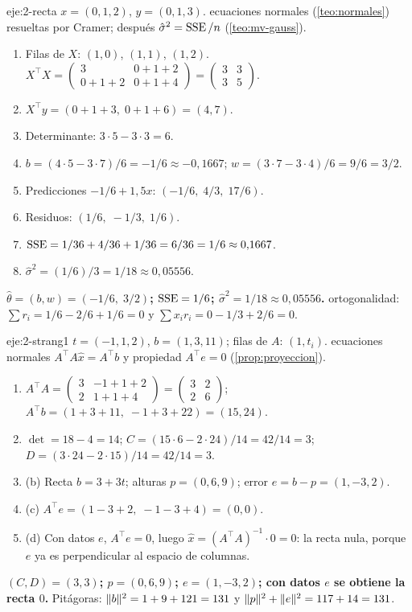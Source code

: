 \begin{solucion}{eje:2-recta}
\datos $x=(0,1,2)$, $y=(0,1,3)$.
\planteamiento ecuaciones normales (\cref{teo:normales}) resueltas por Cramer; después $\hat\sigma^{2}=\operatorname{SSE}/n$ (\cref{teo:mv-gauss}).
\pasos
\begin{enumerate}[label=\arabic*.]
  \item Filas de $X$: $(1,0)$, $(1,1)$, $(1,2)$. $X^{\top}X=\begin{pmatrix}3&0+1+2\\0+1+2&0+1+4\end{pmatrix}=\begin{pmatrix}3&3\\3&5\end{pmatrix}$.
  \item $X^{\top}y=(0+1+3,\;0+1+6)=(4,7)$.
  \item Determinante: $3\cdot 5-3\cdot 3=6$.
  \item $b=(4\cdot 5-3\cdot 7)/6=-1/6\approx-0{,}1667$; $w=(3\cdot 7-3\cdot 4)/6=9/6=3/2$.
  \item Predicciones $-1/6+1{,}5x$: $(-1/6,\;4/3,\;17/6)$.
  \item Residuos: $(1/6,\;-1/3,\;1/6)$.
  \item $\operatorname{SSE}=1/36+4/36+1/36=6/36=1/6\approx 0{,}1667$.
  \item $\hat\sigma^{2}=(1/6)/3=1/18\approx 0{,}05556$.
\end{enumerate}
\resultado \textbf{$\hat\theta=(b,w)=(-1/6,\;3/2)$; $\operatorname{SSE}=1/6$; $\hat\sigma^{2}=1/18\approx 0{,}05556$.}
\comprobacion ortogonalidad: $\sum r_i=1/6-2/6+1/6=0$ y $\sum x_ir_i=0-1/3+2/6=0$.
\end{solucion}

\begin{solucion}{eje:2-strang1}
\datos $t=(-1,1,2)$, $b=(1,3,11)$; filas de $A$: $(1,t_i)$.
\planteamiento ecuaciones normales $A^{\top}A\hat x=A^{\top}b$ y propiedad $A^{\top}e=0$ (\cref{prop:proyeccion}).
\pasos
\begin{enumerate}[label=\arabic*.]
  \item $A^{\top}A=\begin{pmatrix}3&-1+1+2\\2&1+1+4\end{pmatrix}=\begin{pmatrix}3&2\\2&6\end{pmatrix}$; $A^{\top}b=(1+3+11,\;-1+3+22)=(15,24)$.
  \item $\det=18-4=14$; $C=(15\cdot 6-2\cdot 24)/14=42/14=3$; $D=(3\cdot 24-2\cdot 15)/14=42/14=3$.
  \item (b) Recta $b=3+3t$; alturas $p=(0,6,9)$; error $e=b-p=(1,-3,2)$.
  \item (c) $A^{\top}e=(1-3+2,\;-1-3+4)=(0,0)$.
  \item (d) Con datos $e$, $A^{\top}e=0$, luego $\hat x=(A^{\top}A)^{-1}\cdot 0=0$: la recta nula, porque $e$ ya es perpendicular al espacio de columnas.
\end{enumerate}
\resultado \textbf{$(C,D)=(3,3)$; $p=(0,6,9)$; $e=(1,-3,2)$; con datos $e$ se obtiene la recta $0$.}
\comprobacion Pitágoras: $\lVert b\rVert^{2}=1+9+121=131$ y $\lVert p\rVert^{2}+\lVert e\rVert^{2}=117+14=131$.
\end{solucion}

